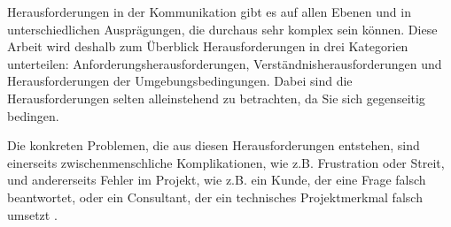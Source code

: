 \documentclass[../main.tex]{subfiles}
\begin{document}
Herausforderungen in der Kommunikation gibt es auf allen Ebenen und in unterschiedlichen Ausprägungen, die durchaus sehr komplex sein können.
Diese Arbeit wird deshalb zum Überblick Herausforderungen in drei Kategorien unterteilen: Anforderungsherausforderungen, Verständnisherausforderungen und Herausforderungen der Umgebungsbedingungen.
Dabei sind die Herausforderungen selten alleinstehend zu betrachten, da Sie sich gegenseitig bedingen.

Die konkreten Problemen, die aus diesen Herausforderungen entstehen, sind einerseits zwischenmenschliche Komplikationen, wie z.B. Frustration oder Streit, und andererseits Fehler im Projekt, wie z.B. ein Kunde, der eine Frage falsch beantwortet, oder ein Consultant, der ein technisches Projektmerkmal falsch umsetzt \autocite{suleiman2022causes}.
\end{document}
